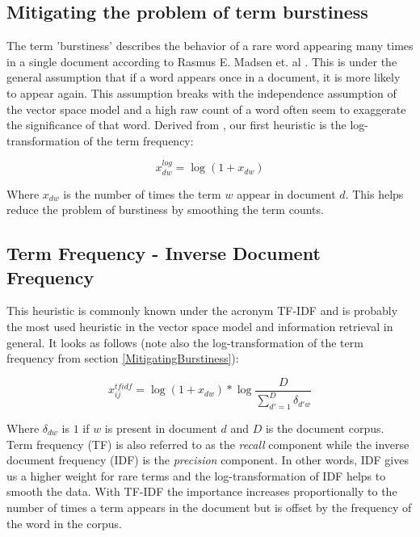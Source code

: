 \subsection{Mitigating the problem of term burstiness\label{MitigatingBurstiness}}

The term 'burstiness' describes the behavior of a rare word appearing
many times in a single document according to Rasmus E. Madsen et. al
\cite{ModelingWordBurstiness2005}. This is under the general
assumption that if a word appears once in a document, it is more
likely to appear again. This assumption breaks with the independence
assumption of the vector space model and a high raw count of a word
often seem to exaggerate the significance of that word. Derived from
\cite{ModelingWordBurstiness2005}, our first heuristic is the
log-transformation of the term frequency:

\[
x_{dw}^{log} = \log{(1 + x_{dw})}
\]

Where $x_{dw}$ is the number of times the term $w$ appear in document
$d$. This helps reduce the problem of burstiness by smoothing the term
counts.

\subsection{Term Frequency - Inverse Document Frequency\label{TFIDF}}

This heuristic is commonly known under the acronym TF-IDF and is
probably the most used heuristic in the vector space model and
information retrieval in general. It looks as follows (note also the
log-transformation of the term frequency from
section \ref{MitigatingBurstiness}):

\[
x_{ij}^{tfidf} = \log{(1 + x_{dw})} * \log{ \frac{D}{\sum_{d\prime = 1}^{D}\delta_{d\prime w}}}
\]

Where $\delta_{dw}$ is $1$ if $w$ is present in document $d$ and $D$
is the document corpus. Term frequency (TF) is also referred to as the
\textit{recall} component while the inverse document frequency (IDF)
is the \textit{precision} component. In other words, IDF gives us a
higher weight for rare terms and the log-transformation of IDF helps
to smooth the data. With TF-IDF the importance increases
proportionally to the number of times a term appears in the document
but is offset by the frequency of the word in the corpus.\\

